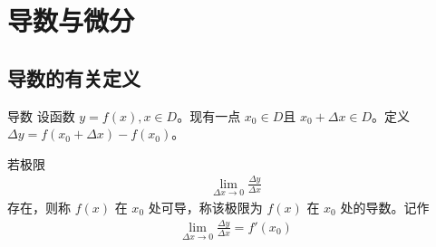 \chapter{导数与微分}  
\section{导数的有关定义}
\begin{definition}{导数}
    设函数 $y=f(x),x\in D$。现有一点 $x_0\in D$且 $x_0+\Delta x \in D$。定义 $\Delta y=f(x_0+\Delta x)-f(x_0)$。

    若极限
    \begin{align}
        \lim_{\Delta x \to 0}\frac{\Delta y}{\Delta x}
    \end{align}
    存在，则称 $f(x)$ 在 $x_0$ 处可导，称该极限为 $f(x)$ 在 $x_0$ 处的导数。记作
    \begin{align}
        \lim_{\Delta x \to 0}\frac{\Delta y}{\Delta x}=f'(x_0)
    \end{align}
\end{definition}
